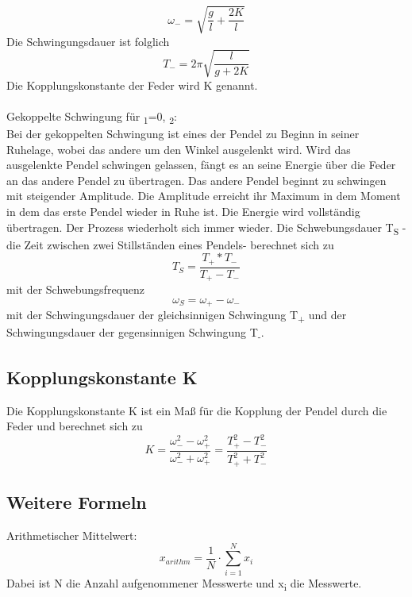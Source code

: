 \documentclass[titlepage=firstcover, captions=tableheading]{scrartcl}
\begin{document}
\begin{displaymath}
    \omega_-=\sqrt{\frac{g}{l}+\frac{2K}{l}}
\end{displaymath}
Die Schwingungsdauer ist folglich
\begin{equation}\label{T-}
    T_-=2\pi\sqrt{\frac{l}{g+2K}}
\end{equation}
Die Kopplungskonstante der Feder wird K genannt.
\\\\
Gekoppelte Schwingung für \alpha\textsubscript{1}=0, \alpha\textsubscript{2}:\\
Bei der gekoppelten Schwingung ist eines der Pendel zu Beginn in seiner Ruhelage, wobei das andere um den Winkel \alpha  ausgelenkt wird. Wird das ausgelenkte Pendel schwingen gelassen, fängt es an seine Energie über die Feder an das andere Pendel zu übertragen. Das andere Pendel beginnt zu schwingen mit steigender Amplitude. Die Amplitude erreicht ihr Maximum in dem Moment in dem das erste Pendel wieder in Ruhe ist. Die Energie wird vollständig übertragen. Der Prozess wiederholt sich immer wieder. Die Schwebungsdauer T\textsubscript{S} -die Zeit zwischen zwei Stillständen eines Pendels- berechnet sich zu 
\begin{equation}\label{TS}
    T_S=\frac{T_+*T_-}{T_+-T_-}
\end{equation}
mit der Schwebungsfrequenz
\begin{displaymath}
    \omega_S=\omega_+-\omega_-
\end{displaymath}
mit der Schwingungsdauer der gleichsinnigen Schwingung T\textsubscript{+} und der Schwingungsdauer der gegensinnigen Schwingung T\textsubscript{-}. \\
\subsection{Kopplungskonstante K}
\noindent Die Kopplungskonstante K ist ein Maß für die Kopplung der Pendel durch die Feder und berechnet sich zu 
\begin{equation}\label{K}
    K=\frac{\omega_-^2-\omega_+^2}{\omega_-^2+\omega_+^2}=\frac{T_+^2-T_-^2}{T_+^2+T_-^2}
\end{equation}
\subsection{Weitere Formeln}
\noindent Arithmetischer Mittelwert:\\
\begin{equation} \label{Mittelwert}  
    x_{arithm}=\frac{1}{N}\cdot \sum \limits_{i=1}^{N}x_i
\end{equation}
Dabei ist N die Anzahl aufgenommener Messwerte und x\textsubscript{i} die Messwerte.
\end{document}
